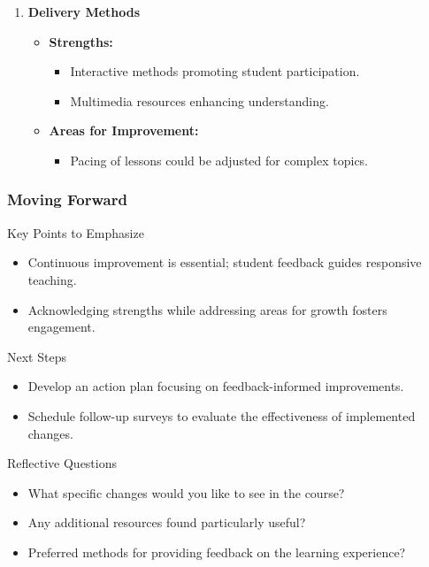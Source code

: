 \documentclass[aspectratio=169]{beamer}
\begin{document}
\begin{frame}[fragile]
\begin{enumerate}
        \item \textbf{Delivery Methods}
            \begin{itemize}
                \item \textbf{Strengths:}
                \begin{itemize}
                    \item Interactive methods promoting student participation.
                    \item Multimedia resources enhancing understanding.
                \end{itemize}
                \item \textbf{Areas for Improvement:}
                \begin{itemize}
                    \item Pacing of lessons could be adjusted for complex topics.
                \end{itemize}
            \end{itemize}
    \end{enumerate}
\end{frame}

\begin{frame}[fragile]
    \frametitle{Moving Forward}
    \begin{block}{Key Points to Emphasize}
        \begin{itemize}
            \item Continuous improvement is essential; student feedback guides responsive teaching.
            \item Acknowledging strengths while addressing areas for growth fosters engagement.
        \end{itemize}
    \end{block}
    
    \begin{block}{Next Steps}
        \begin{itemize}
            \item Develop an action plan focusing on feedback-informed improvements.
            \item Schedule follow-up surveys to evaluate the effectiveness of implemented changes.
        \end{itemize}
    \end{block}
    
    \begin{block}{Reflective Questions}
        \begin{itemize}
            \item What specific changes would you like to see in the course?
            \item Any additional resources found particularly useful?
            \item Preferred methods for providing feedback on the learning experience?
        \end{itemize}
    \end{block}
\end{frame}
\end{document}
